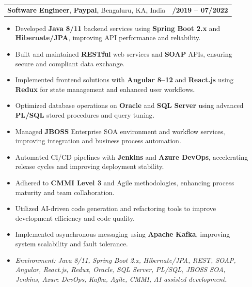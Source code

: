 \documentclass[letterpaper,11pt]{article}
\makeatletter
\newcommand{\resumeItem}[1]{
  \item\footnotesize{
    {#1 \vspace{-2pt}}
  }
}
\newcommand{\resumeSubheading}[4]{
  \vspace{-2pt}\item
    \begin{tabular*}{1.0\textwidth}[t]{l@{\extracolsep{\fill}}r}
      \textbf{\fontsize{10pt}{14pt}\selectfont #3}, \textbf{\fontsize{10pt}{14pt}\selectfont #1}, \fontsize{10pt}{14pt}\selectfont #4 & \textbf{\fontsize{10pt}{14pt}\selectfont #2} \\
    \end{tabular*}\vspace{-7pt}
}
\newcommand{\resumeItemListStart}{\begin{itemize}[leftmargin=*]}
\newcommand{\resumeItemListEnd}{\end{itemize}\vspace{-5pt}}
\makeatother
\begin{document}
\resumeSubheading
{Paypal}{08/2019 -- 07/2022}
{Software Engineer}{Bengaluru, KA, India}
\resumeItemListStart
  \resumeItem{Developed \textbf{Java 8/11} backend services using \textbf{Spring Boot 2.x} and \textbf{Hibernate/JPA}, improving API performance and reliability.}
  \resumeItem{Built and maintained \textbf{RESTful} web services and \textbf{SOAP} APIs, ensuring secure and compliant data exchange.}
  \resumeItem{Implemented frontend solutions with \textbf{Angular 8--12} and \textbf{React.js} using \textbf{Redux} for state management and enhanced user workflows.}
  \resumeItem{Optimized database operations on \textbf{Oracle} and \textbf{SQL Server} using advanced \textbf{PL/SQL} stored procedures and query tuning.}
  \resumeItem{Managed \textbf{JBOSS} Enterprise SOA environment and workflow services, improving integration and business process automation.}
  \resumeItem{Automated CI/CD pipelines with \textbf{Jenkins} and \textbf{Azure DevOps}, accelerating release cycles and improving deployment stability.}
  \resumeItem{Adhered to \textbf{CMMI Level 3} and Agile methodologies, enhancing process maturity and team collaboration.}
  \resumeItem{Utilized AI-driven code generation and refactoring tools to improve development efficiency and code quality.}
  \resumeItem{Implemented asynchronous messaging using \textbf{Apache Kafka}, improving system scalability and fault tolerance.}
  \resumeItem{\textit{Environment: Java 8/11, Spring Boot 2.x, Hibernate/JPA, REST, SOAP, Angular, React.js, Redux, Oracle, SQL Server, PL/SQL, JBOSS SOA, Jenkins, Azure DevOps, Kafka, Agile, CMMI, AI-assisted development.}}
\resumeItemListEnd
\end{document}
